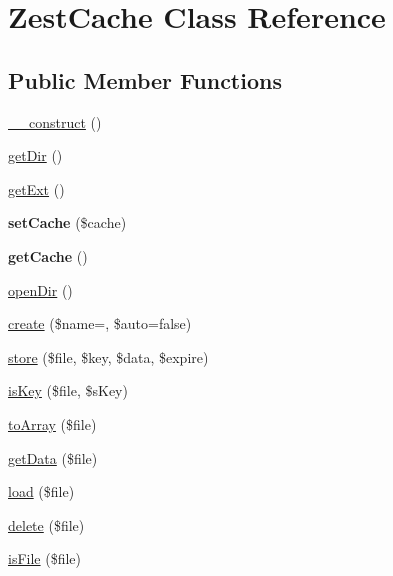 \hypertarget{class_zest_1_1_cache_1_1_zest_cache_1_1_zest_cache}{}\section{Zest\+Cache Class Reference}
\label{class_zest_1_1_cache_1_1_zest_cache_1_1_zest_cache}
\subsection*{Public Member Functions}
\begin{DoxyCompactItemize}
\item 
\mbox{\hyperlink{class_zest_1_1_cache_1_1_zest_cache_1_1_zest_cache_a095c5d389db211932136b53f25f39685}{\+\_\+\+\_\+construct}} ()
\item 
\mbox{\hyperlink{class_zest_1_1_cache_1_1_zest_cache_1_1_zest_cache_ab09f9419dbc35f97d48aafccc2416ed1}{get\+Dir}} ()
\item 
\mbox{\hyperlink{class_zest_1_1_cache_1_1_zest_cache_1_1_zest_cache_a57a607b4d13b0d1ad2367fd868bad64b}{get\+Ext}} ()
\item 
\mbox{\label{class_zest_1_1_cache_1_1_zest_cache_1_1_zest_cache_a1bfa0b30d50d9ccce38cd1bcf2375109}} 
{\bfseries set\+Cache} (\$cache)
\item 
\mbox{\label{class_zest_1_1_cache_1_1_zest_cache_1_1_zest_cache_ac4d56a528ec8b416428a2c3c86672dc8}} 
{\bfseries get\+Cache} ()
\item 
\mbox{\hyperlink{class_zest_1_1_cache_1_1_zest_cache_1_1_zest_cache_a930c737e9680d9b351c6e966bc0719b1}{open\+Dir}} ()
\item 
\mbox{\hyperlink{class_zest_1_1_cache_1_1_zest_cache_1_1_zest_cache_a506164830505f7e79da131116185e661}{create}} (\$name=\textquotesingle{}\textquotesingle{}, \$auto=false)
\item 
\mbox{\hyperlink{class_zest_1_1_cache_1_1_zest_cache_1_1_zest_cache_a20403422dcbb1e348d4c077b15bbfaea}{store}} (\$file, \$key, \$data, \$expire)
\item 
\mbox{\hyperlink{class_zest_1_1_cache_1_1_zest_cache_1_1_zest_cache_a2a03f6234b8581ecba754456e0fc13a9}{is\+Key}} (\$file, \$s\+Key)
\item 
\mbox{\hyperlink{class_zest_1_1_cache_1_1_zest_cache_1_1_zest_cache_a1908e580493f970d18a429b5ec0e789f}{to\+Array}} (\$file)
\item 
\mbox{\hyperlink{class_zest_1_1_cache_1_1_zest_cache_1_1_zest_cache_a102396013531dbe613a08448f8ed3e2f}{get\+Data}} (\$file)
\item 
\mbox{\hyperlink{class_zest_1_1_cache_1_1_zest_cache_1_1_zest_cache_aaa4e95f27857ab78defda3e0c0b7039b}{load}} (\$file)
\item 
\mbox{\hyperlink{class_zest_1_1_cache_1_1_zest_cache_1_1_zest_cache_a321969477d98aef4154c184217d1c5e0}{delete}} (\$file)
\item 
\mbox{\hyperlink{class_zest_1_1_cache_1_1_zest_cache_1_1_zest_cache_acf964fa7d3e69b8c361f2edf5d6790eb}{is\+File}} (\$file)
\end{DoxyCompactItemize}


